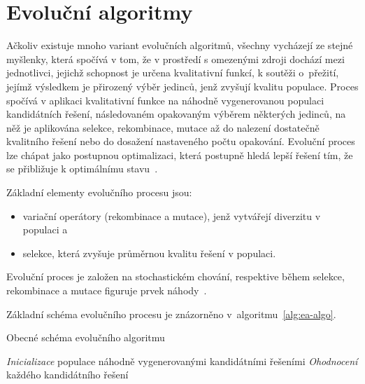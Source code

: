 \section{Evoluční algoritmy}\label{sec:ea}
Ačkoliv existuje mnoho variant evolučních algoritmů, všechny vycházejí ze stejné myšlenky, která spočívá v tom, že v prostředí s omezenými zdroji dochází mezi jednotlivci, jejichž schopnost je určena kvalitativní funkcí, k soutěži o~přežití, jejímž výsledkem je přirozený výběr jedinců, jenž zvyšují kvalitu populace. 
Proces spočívá v aplikaci kvalitativní funkce na náhodně vygenerovanou populaci kandidátních řešení, následovaném opakovaným výběrem některých jedinců, na něž je aplikována selekce, rekombinace, mutace až do nalezení dostatečně kvalitního řešení nebo do dosažení nastaveného počtu opakování.  
Evoluční proces lze chápat jako postupnou optimalizaci, která postupně hledá lepší řešení tím, že se přibližuje k optimálnímu stavu~\cite{IntroductionToEvoComputing}. 

Základní elementy evolučního procesu jsou:
\begin{itemize}
    \item variační operátory (rekombinace a mutace), jenž vytvářejí diverzitu v populaci a
    \item selekce, která zvyšuje průměrnou kvalitu řešení v populaci.
\end{itemize}
Evoluční proces je založen na stochastickém chování, respektive během selekce, rekombinace a mutace figuruje prvek náhody~\cite{IntroductionToEvoComputing}. 

Základní schéma evolučního procesu je znázorněno v~algoritmu~\ref{alg:ea-algo}.

\begin{algorithm}[H]
    \caption{Obecné schéma evolučního algoritmu~\cite{IntroductionToEvoComputing}}
    \label{alg:ea-algo}
    \emph{Inicializace} populace náhodně vygenerovanými kandidátními řešeními\;
    \emph{Ohodnocení} každého kandidátního řešení\;
\end{algorithm}

